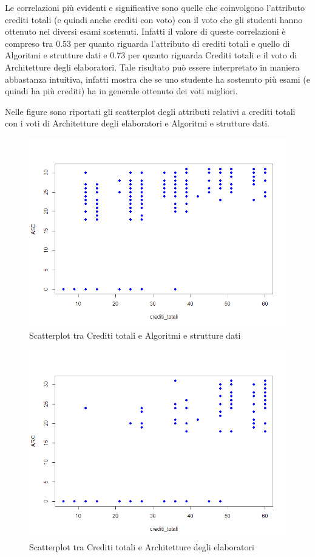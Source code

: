 \documentclass[12pt]{article}
\begin{document}
Le correlazioni più evidenti e significative sono quelle che coinvolgono l'attributo crediti totali (e quindi anche crediti con voto) con il voto che gli studenti hanno ottenuto nei diversi esami sostenuti.
Infatti il valore di queste correlazioni è compreso tra 0.53 per quanto riguarda l'attributo di crediti totali e quello di Algoritmi e strutture dati e 0.73 per quanto riguarda Crediti totali e il voto di Architetture degli elaboratori.
Tale risul\-tato può essere interpretato in maniera abbastanza intuitiva, infatti mostra che se uno studente ha sostenuto più esami (e quindi ha più crediti) ha in generale ottenuto dei voti migliori.

Nelle figure sono riportati gli scatterplot degli attributi relativi a crediti totali con i voti di Architetture degli elaboratori e Algoritmi e strutture dati.
\begin{figure}[H]
	\includegraphics[width=\textwidth]{img/creditiAsd.png}
	\caption{Scatterplot tra Crediti totali e Algoritmi e strutture dati}
\end{figure}

\begin{figure}[H]
	\includegraphics[width=\textwidth]{img/creditiArc.png}
	\caption{Scatterplot tra Crediti totali e Architetture degli elaboratori}
\end{figure}
\end{document}
